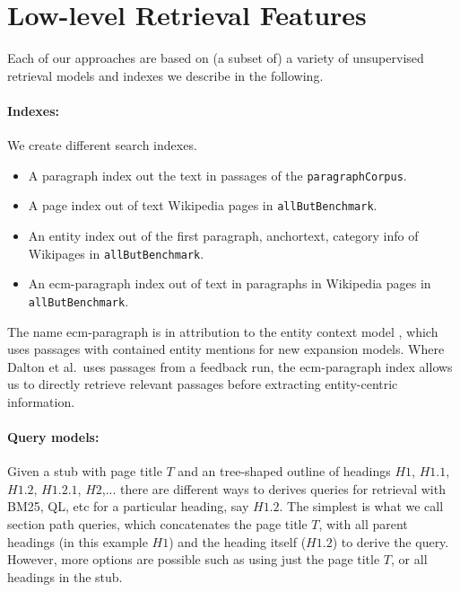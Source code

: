 \documentclass{article}
\begin{document}
\section{Low-level Retrieval Features}

Each of our approaches are based on (a subset of) a variety of unsupervised retrieval models and indexes we describe in the following.

\paragraph{Indexes:}

We create different search indexes. 
\begin{itemize}
    \item A paragraph index out the text in passages of the \texttt{paragraphCorpus}.
    \item A page index out of text Wikipedia pages in \texttt{allButBenchmark}. 
    \item An entity index out of the first paragraph, anchortext, category info of Wikipages in \texttt{allButBenchmark}.
    \item An ecm-paragraph index out of text in paragraphs in Wikipedia pages in \texttt{allButBenchmark}.
\end{itemize}

The name ecm-paragraph is in attribution to the entity context model \cite{dalton2014entity}, which uses passages with contained entity mentions for new expansion models. Where Dalton et al.\ uses passages from a feedback run, the ecm-paragraph index allows us to directly retrieve relevant passages before extracting entity-centric information.

\paragraph{Query models:}
Given a stub with page title $T$ and an tree-shaped outline of headings $H1$, $H1.1$, $H1.2$, $H1.2.1$, $H2$,... there are different ways to derives queries for retrieval with BM25, QL, etc for a particular heading, say $H1.2$. The simplest is what we call section path queries, which concatenates the page title $T$, with all parent headings (in this example $H1$) and the heading itself ($H1.2$) to derive the query. However, more options are possible such as using just the page title $T$, or all headings in the stub.
\end{document}

